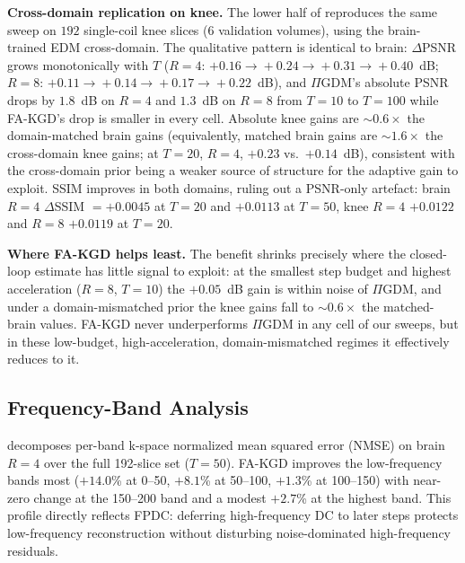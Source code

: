 \documentclass[10pt,twocolumn,letterpaper]{article}
\newcommand{\PIGDM}{$\Pi$GDM}
\begin{document}
\textbf{Cross-domain replication on knee.} The lower half of
 reproduces the same sweep on $192$ single-coil knee slices
($6$ validation volumes), using the brain-trained EDM cross-domain. The
qualitative pattern is identical to brain: $\Delta$PSNR grows monotonically
with $T$ ($R{=}4$: $+0.16\!\to\!+0.24\!\to\!+0.31\!\to\!+0.40$~dB; $R{=}8$:
$+0.11\!\to\!+0.14\!\to\!+0.17\!\to\!+0.22$~dB), and \PIGDM{}'s absolute
PSNR drops by $1.8$~dB on $R{=}4$ and $1.3$~dB on $R{=}8$ from $T{=}10$ to
$T{=}100$ while FA-KGD's drop is smaller in every cell. Absolute knee gains
are $\sim$$0.6\times$ the domain-matched brain gains (equivalently, matched
brain gains are $\sim$$1.6\times$ the cross-domain knee gains; at $T{=}20$,
$R{=}4$, $+0.23$ vs.\ $+0.14$~dB), consistent with the cross-domain prior
being a weaker source of structure for the adaptive gain to exploit. SSIM
improves in both domains, ruling out a PSNR-only artefact: brain $R{=}4$
$\Delta$SSIM $=+0.0045$ at $T{=}20$ and $+0.0113$ at $T{=}50$, knee $R{=}4$
$+0.0122$ and $R{=}8$ $+0.0119$ at $T{=}20$.

\textbf{Where FA-KGD helps least.} The benefit shrinks precisely where the
closed-loop estimate has little signal to exploit: at the smallest step budget
and highest acceleration ($R{=}8$, $T{=}10$) the $+0.05$~dB gain is within
noise of $\Pi$GDM, and under a domain-mismatched prior the knee gains fall to
$\sim$$0.6\times$ the matched-brain values. FA-KGD never underperforms
$\Pi$GDM in any cell of our sweeps, but in these low-budget, high-acceleration,
domain-mismatched regimes it effectively reduces to it.

\subsection{Frequency-Band Analysis}

 decomposes per-band k-space normalized mean squared error
(NMSE) on brain $R{=}4$ over the full 192-slice set ($T{=}50$).
FA-KGD improves the low-frequency bands most ($+14.0$\% at 0--50, $+8.1$\%
at 50--100, $+1.3$\% at 100--150) with near-zero change at the 150--200
band and a modest $+2.7$\% at the highest band. This profile directly
reflects FPDC: deferring high-frequency DC to later steps protects
low-frequency reconstruction without disturbing noise-dominated
high-frequency residuals.
\end{document}
